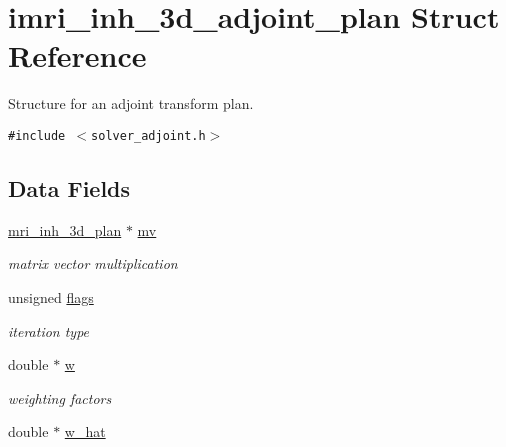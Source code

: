 \hypertarget{structimri__inh__3d__adjoint__plan}{
\section{imri\_\-inh\_\-3d\_\-adjoint\_\-plan Struct Reference}
\label{structimri__inh__3d__adjoint__plan}
}
Structure for an adjoint transform plan.  


{\tt \#include $<$solver\_\-adjoint.h$>$}

\subsection*{Data Fields}
\begin{CompactItemize}
\item 
\hypertarget{structimri__inh__3d__adjoint__plan_o0}{
\hyperlink{structmri__inh__3d__plan}{mri\_\-inh\_\-3d\_\-plan} $\ast$ \hyperlink{structimri__inh__3d__adjoint__plan_o0}{mv}}
\label{structimri__inh__3d__adjoint__plan_o0}

\begin{CompactList}\small\item\em matrix vector multiplication \item\end{CompactList}\item 
\hypertarget{structimri__inh__3d__adjoint__plan_o1}{
unsigned \hyperlink{structimri__inh__3d__adjoint__plan_o1}{flags}}
\label{structimri__inh__3d__adjoint__plan_o1}

\begin{CompactList}\small\item\em iteration type \item\end{CompactList}\item 
\hypertarget{structimri__inh__3d__adjoint__plan_o2}{
double $\ast$ \hyperlink{structimri__inh__3d__adjoint__plan_o2}{w}}
\label{structimri__inh__3d__adjoint__plan_o2}

\begin{CompactList}\small\item\em weighting factors \item\end{CompactList}\item 
\hypertarget{structimri__inh__3d__adjoint__plan_o3}{
double $\ast$ \hyperlink{structimri__inh__3d__adjoint__plan_o3}{w\_\-hat}}
\label{structimri__inh__3d__adjoint__plan_o3}


\end{CompactItemize}
